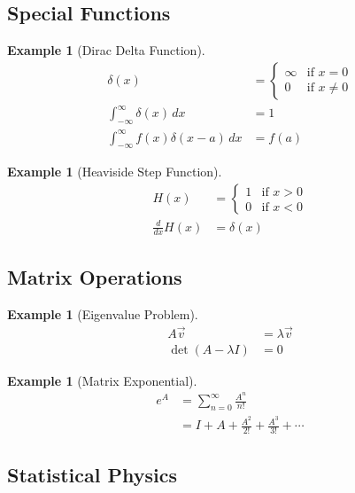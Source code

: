 \documentclass{article}
\newtheorem{example}[theorem]{Example}
\begin{document}
\subsection{Special Functions}

\begin{example}[Dirac Delta Function]
\begin{align*}
    \delta(x) &= \begin{cases}
        \infty & \text{if } x = 0 \\
        0 & \text{if } x \neq 0
    \end{cases} \\
    \int_{-\infty}^{\infty} \delta(x) \, dx &= 1 \\
    \int_{-\infty}^{\infty} f(x)\delta(x-a) \, dx &= f(a)
\end{align*}
\end{example}

\begin{example}[Heaviside Step Function]
\begin{align*}
    H(x) &= \begin{cases}
        1 & \text{if } x > 0 \\
        0 & \text{if } x < 0
    \end{cases} \\
    \frac{d}{dx}H(x) &= \delta(x)
\end{align*}
\end{example}

\subsection{Matrix Operations}

\begin{example}[Eigenvalue Problem]
\begin{align*}
    A\vec{v} &= \lambda\vec{v} \\
    \det(A - \lambda I) &= 0
\end{align*}
\end{example}

\begin{example}[Matrix Exponential]
\begin{align*}
    e^A &= \sum_{n=0}^{\infty} \frac{A^n}{n!} \\
    &= I + A + \frac{A^2}{2!} + \frac{A^3}{3!} + \cdots
\end{align*}
\end{example}

\subsection{Statistical Physics}
\end{document}
